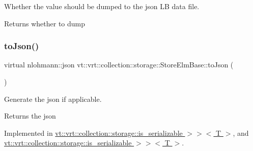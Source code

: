 Whether the value should be dumped to the json LB data file. 

\begin{DoxyReturn}{Returns}
whether to dump 
\end{DoxyReturn}
\mbox{\label{structvt_1_1vrt_1_1collection_1_1storage_1_1_store_elm_base_a3c207bb3612dba2db9fef7e0e7f2e717}} 
\subsubsection{\texorpdfstring{to\+Json()}{toJson()}}
{\footnotesize\ttfamily virtual nlohmann\+::json vt\+::vrt\+::collection\+::storage\+::\+Store\+Elm\+Base\+::to\+Json (\begin{DoxyParamCaption}{ }\end{DoxyParamCaption})\hspace{0.3cm}{\ttfamily [pure virtual]}}



Generate the json if applicable. 

\begin{DoxyReturn}{Returns}
the json 
\end{DoxyReturn}


Implemented in \hyperlink{structvt_1_1vrt_1_1collection_1_1storage_1_1_store_elm_3_01_t_00_01typename_01std_1_1enable__if_f645d7011e081ebef1092328b0917bfc_aea4bf3c797fb58b2e53fcbf6010c31d1}{vt\+::vrt\+::collection\+::storage\+::is\+\_\+serializable $>$$>$$<$ T $>$}, and \hyperlink{structvt_1_1vrt_1_1collection_1_1storage_1_1_store_elm_3_01_t_00_01typename_01std_1_1enable__if_947e0655769addb625fb511f777768bd_aea4bf3c797fb58b2e53fcbf6010c31d1}{vt\+::vrt\+::collection\+::storage\+::is\+\_\+serializable $>$$>$$<$ T $>$}.

\mbox{\label{structvt_1_1vrt_1_1collection_1_1storage_1_1_store_elm_base_a1cfa9cc885ea3f22678b80701498c0ff}} 

